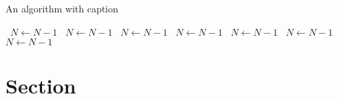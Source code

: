 \documentclass[a4paper]{article}
\begin{document}
\begin{algorithm}
\caption{An algorithm with caption}
\begin{algorithmic}
\    \State $N \gets N - 1$
\    \State $N \gets N - 1$
\    \State $N \gets N - 1$
\    \State $N \gets N - 1$
\    \State $N \gets N - 1$
\    \State $N \gets N - 1$
\    \State $N \gets N - 1$
\EndWhile
\end{algorithmic}
\end{algorithm}

\section{Section}
\end{document}
